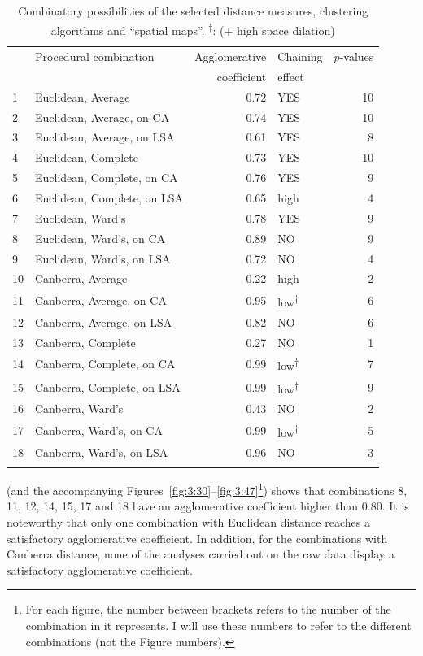 \begin{table}\caption{Combinatory possibilities of the selected distance measures, clustering algorithms and ``spatial maps''. \textsuperscript{†}: (+ high space dilation)\label{tab:3:13}}
\begin{tabular}{llrlr} 
\lsptoprule
&  Procedural combination &  Agglomerative & {Chaining}  & {$p$-values}\\
&                         &  coefficient   & {effect} \\\midrule
1 & Euclidean, Average          & 0.72 & YES & 10\\
2 & Euclidean, Average, on CA   & 0.74 & YES & 10\\
3 & Euclidean, Average, on LSA  & 0.61 & YES & 8\\
4 & Euclidean, Complete         & 0.73 & YES & 10\\
5 & Euclidean, Complete, on CA  & 0.76 & YES & 9\\
6 & Euclidean, Complete, on LSA & 0.65 & high & 4\\
7 & Euclidean, Ward’s           & 0.78 & YES & 9\\
8 & Euclidean, Ward’s, on CA    & 0.89 & NO & 9\\
9 & Euclidean, Ward’s, on LSA   & 0.72 & NO & 4\\
10 & Canberra, Average          & 0.22 & high & 2\\
11 & Canberra, Average, on CA   & 0.95 & low\textsuperscript{†}  & 6\\
12 & Canberra, Average, on LSA  & 0.82 & NO & 6\\
13 & Canberra, Complete         & 0.27 & NO & 1\\
14 & Canberra, Complete, on CA  & 0.99 & low\textsuperscript{†} & 7\\
15 & Canberra, Complete, on LSA & 0.99 & low\textsuperscript{†} & 9\\
16 & Canberra, Ward’s           & 0.43 & NO & 2\\
17 & Canberra, Ward’s, on CA    & 0.99 & low\textsuperscript{†} & 5\\
18 & Canberra, Ward’s, on LSA   & 0.96 & NO & 3\\
\lspbottomrule
\end{tabular}
\end{table}

 (and the accompanying Figures~\ref{fig:3:30}--\ref{fig:3:47}\footnote{For each figure, the number between brackets refers to the number of the combination in  it represents. I will use these numbers to refer to the different combinations (not the Figure numbers).}) shows that combinations 8, 11, 12, 14, 15, 17 and 18 have an agglomerative coefficient higher than 0.80. It is noteworthy that only one combination with Euclidean distance reaches a satisfactory agglomerative coefficient. In addition, for the combinations with Canberra distance, none of the analyses carried out on the raw data display a satisfactory agglomerative coefficient.

